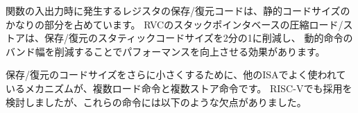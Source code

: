 \begin{commentary}
\begin{comment}
Register save/restore code at function entry/exit represents a
significant portion of static code size.  The stack-pointer-based
compressed loads and stores in RVC are effective at reducing the
save/restore static code size by a factor of 2 while improving
performance by reducing dynamic instruction bandwidth.
\end{comment}
関数の入出力時に発生するレジスタの保存/復元コードは、静的コードサイズのかなりの部分を占めています。
RVCのスタックポインタベースの圧縮ロード/ストアは、保存/復元のスタティックコードサイズを2分の1に削減し、
動的命令のバンド幅を削減することでパフォーマンスを向上させる効果があります。

\begin{comment}
A common mechanism used in other ISAs to further reduce
save/restore code size is load-multiple and store-multiple
instructions.  We considered adopting these for RISC-V but noted the
following drawbacks to these instructions:
\end{comment}
保存/復元のコードサイズをさらに小さくするために、他のISAでよく使われているメカニズムが、複数ロード命令と複数ストア命令です。
RISC-Vでも採用を検討しましたが、これらの命令には以下のような欠点がありました。


\end{commentary}
